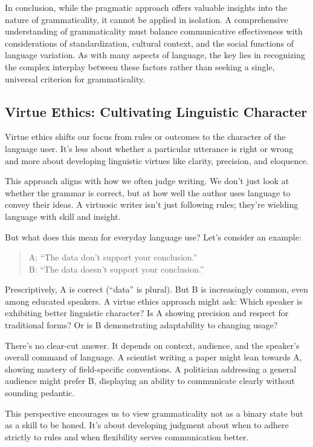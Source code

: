 In conclusion, while the pragmatic approach offers valuable insights into the nature of grammaticality, it cannot be applied in isolation. A comprehensive understanding of grammaticality must balance communicative effectiveness with considerations of standardization, cultural context, and the social functions of language variation. As with many aspects of language, the key lies in recognizing the complex interplay between these factors rather than seeking a single, universal criterion for grammaticality.

\subsection{Virtue Ethics: Cultivating Linguistic Character}

Virtue ethics shifts our focus from rules or outcomes to the character of the language user. It's less about whether a particular utterance is right or wrong and more about developing linguistic virtues like clarity, precision, and eloquence.

This approach aligns with how we often judge writing. We don't just look at whether the grammar is correct, but at how well the author uses language to convey their ideas. A virtuosic writer isn't just following rules; they're wielding language with skill and insight.

But what does this mean for everyday language use? Let's consider an example:

\begin{quote}
A: ``The data don't support your conclusion.''\\
B: ``The data doesn't support your conclusion.''
\end{quote}

Prescriptively, A is correct (``data'' is plural). But B is increasingly common, even among educated speakers. A virtue ethics approach might ask: Which speaker is exhibiting better linguistic character? Is A showing precision and respect for traditional forms? Or is B demonstrating adaptability to changing usage?

There's no clear-cut answer. It depends on context, audience, and the speaker's overall command of language. A scientist writing a paper might lean towards A, showing mastery of field-specific conventions. A politician addressing a general audience might prefer B, displaying an ability to communicate clearly without sounding pedantic.

This perspective encourages us to view grammaticality not as a binary state but as a skill to be honed. It's about developing judgment about when to adhere strictly to rules and when flexibility serves communication better.

